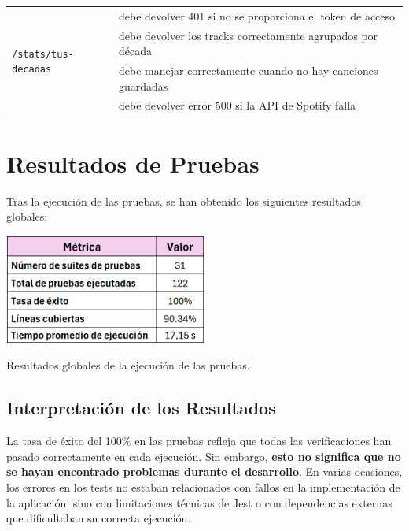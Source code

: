 \begin{longtable}{|p{5cm}|p{9cm}|}
    \multirow{4}{*}{\texttt{/stats/tus-decadas}}          & debe devolver 401 si no se proporciona el token de acceso                                \\ \cline{2-2}
                                                          & debe devolver los tracks correctamente agrupados por década                              \\ \cline{2-2}
                                                          & debe manejar correctamente cuando no hay canciones guardadas                             \\ \cline{2-2}
                                                          & debe devolver error 500 si la API de Spotify falla                                       \\ \hline
\end{longtable}







\section{Resultados de Pruebas}

Tras la ejecución de las pruebas, se han obtenido los siguientes resultados globales:

\begin{table}[htbp]
    \centering
    \includegraphics[width=0.5\textwidth]{figures/resultado_tests.png}
    \captionsetup{skip=7pt}
    \caption{Resultados globales de la ejecución de las pruebas.}
    \label{tab:resultado_tests}
\end{table}

\subsection{Interpretación de los Resultados}

La tasa de éxito del 100\% en las pruebas refleja que todas las verificaciones han pasado correctamente en cada ejecución. Sin embargo, \textbf{esto no significa que no se hayan encontrado problemas durante el desarrollo}. En varias ocasiones, los errores en los tests no estaban relacionados con fallos en la implementación de la aplicación, sino con limitaciones técnicas de Jest o con dependencias externas que dificultaban su correcta ejecución.

